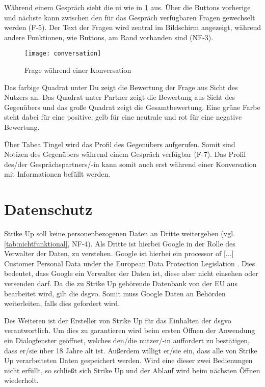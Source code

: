 Während einem Gespräch sieht die \gls{ui} wie in \ref{img:conversation} aus. Über die Buttons \glqq{}vorherige\grqq{} und \glqq{}nächste\grqq{} kann zwischen den für das Gespräch
verfügbaren Fragen gewechselt werden (F-5). Der Text der Fragen wird zentral im Bildschirm angezeigt, während andere Funktionen, wie Buttons, am Rand vorhanden sind (NF-3).
\begin{figure}[htpb]
    \centering
    \texttt{[image: conversation]}
    \caption{Frage während einer Konversation}
    \label{img:conversation}
\end{figure}
Das farbige Quadrat unter \glqq{}Du\grqq{} zeigt die Bewertung der Frage aus Sicht des Nutzers an. Das Quadrat unter \glqq{}Partner\grqq{} zeigt die Bewertung aus Sicht des Gegenübers
und das große Quadrat zeigt die Gesamtbewertung. Eine grüne Farbe steht dabei für eine positive, gelb für eine neutrale und rot für eine negative Bewertung.

Über \glqq{}Tabea Tingel\grqq{} wird das Profil des Gegenübers aufgerufen. Somit sind Notizen des Gegenübers während einem Gespräch verfügbar (F-7). Das Profil des/der Gesprächspartners/-in
kann somit auch erst während einer Konversation mit Informationen befüllt werden.


\section{Datenschutz}
\label{sec:datenschutz}

Strike Up soll keine personenbezogenen Daten an Dritte weitergeben (vgl. \ref{tab:nichtfunktional}, NF-4). Als \glqq{}Dritte\grqq{} ist hierbei Google in der Rolle des Verwalter der Daten,
zu verstehen. \newline
Google ist hierbei ein \glqq{}processor of [...] Customer Personal Data under the European Data Protection Legislation\grqq{} \cite{misc:firebase_terms}. Dies bedeutet, dass Google ein
Verwalter der Daten ist, diese aber nicht einsehen oder versenden darf. \newline
Da die zu Strike Up gehörende Datenbank von der EU aus bearbeitet wird, gilt die \gls{dsgvo}. Somit muss Google Daten an Behörden weiterleiten, falls dies gefordert wird.

Des Weiteren ist der Ersteller von Strike Up für das Einhalten der \gls{dsgvo} verantwortlich. Um dies zu garantieren wird beim ersten Öffnen der Anwendung ein Dialogfenster geöffnet,
welches den/die nutzer/-in auffordert zu bestätigen, dass er/sie über 18 Jahre alt ist. Außerdem willigt er/sie ein, dass alle von Strike Up verarbeiteten Daten gespeichert werden. \newline
Wird eine dieser zwei Bedienungen nicht erfüllt, so schließt sich Strike Up und der Ablauf wird beim nächsten Öffnen wiederholt.

